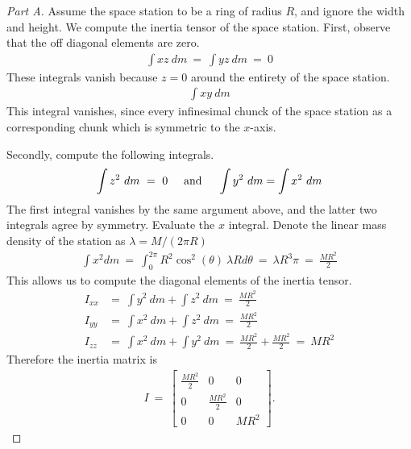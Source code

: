 \documentclass{article}
\numberwithin{equation}{section}
\newcommand{\textAnd}{
    {
        \hspace{5mm}
        \textrm{and}
        \hspace{5mm}
    }
}
\begin{document}
\begin{proof}[Part A]
    Assume the space station to be a ring of radius $R$, 
    and ignore the width and height. 
    We compute the inertia tensor of the space station. 
    First, observe that the off diagonal elements are zero. 
    \begin{align}
        \int xz \ dm \ = \ \int yz \ dm  \ = \ 0
    \end{align}
    These integrals vanish because $z = 0$ around the 
    entirety of the space station. 
    \begin{align}
        \int xy \ dm 
    \end{align}
    This integral vanishes, since every infinesimal 
    chunck of the space station as a corresponding chunk 
    which is symmetric to the $x$-axis. 

    Secondly, compute the following integrals. 
    \begin{align}
        \int z^2 \  dm\ = \ 0 \textAnd  \int y^2 \ dm = \int x^2 \ dm
    \end{align}
    The first integral vanishes by the same argument above, and 
    the latter two integrals agree by symmetry. Evaluate the $x$ integral.
    Denote the linear mass density of the station as 
    $\lambda = M/(2\pi R)$ 
    \begin{align}
        \int x^2 dm \ = \ \int_0^{2\pi} R^2 \cos^2(\theta )\ \lambda R d\theta 
        \ = \ \lambda R^3 \pi \ = \ \frac {M R^2} 2
    \end{align}
    This allows us to compute the diagonal elements of 
    the inertia tensor. 
    \begin{align}
        I_{xx} & = \ 
        \int y^2 \ dm + \int z^2 \ dm \ = \ \frac {MR^2} 2 \\ 
        I_{yy} & = \
        \int x^2 \ dm + \int z^2 \ dm \ = \ \frac {MR^2 } 2\\ 
        I_{zz} & = \  
        \int x^2 \ dm + \int y^2 \ dm \ = \ \frac {MR^2 } 2 + \frac {MR^2 } 2 \ = \ MR^2 
    \end{align}
    Therefore the inertia matrix is 
    \begin{align}
        I \ = \ 
        \begin{bmatrix}
            \frac {MR^2} 2 & 0 & 0 \\ 
            0 & \frac {MR^2} 2 & 0 \\ 
            0 & 0 & MR^2
        \end{bmatrix}. 
    \end{align}
\end{proof}
\end{document}
